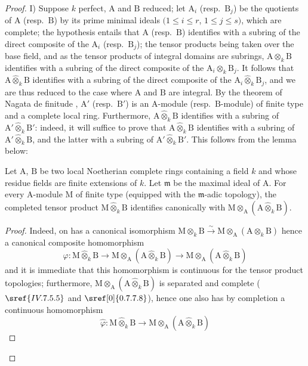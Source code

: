 \begin{proof}
I) Suppose $k$ perfect, $\mathrm{A}$ and $\mathrm{B}$ reduced; let $\mathrm{A}_i$ (resp.\ $\mathrm{B}_j$) be the quotients of $\mathrm{A}$ (resp.\ $\mathrm{B}$) by its prime minimal ideals $(1\leqslant i\leqslant r$, $1\leqslant j\leqslant s)$, which are complete; the hypothesis entails that $\mathrm{A}$ (resp.\ $\mathrm{B}$) identifies with a subring of the direct composite of the $\mathrm{A}_i$ (resp.\ $\mathrm{B}_j$); the tensor products being taken over the base field, and as the tensor products of integral domains are subrings, $\mathrm{A}\otimes_k\mathrm{B}$ identifies with a subring of the direct composite of the $\mathrm{A}_i\otimes_k\mathrm{B}_j$. It follows that $\mathrm{A}\widehat{\otimes}_k\mathrm{B}$ identifies with a subring of the direct composite of the $\mathrm{A}_i\widehat{\otimes}_k\mathrm{B}_j$, and we are thus reduced to the case where $\mathrm{A}$ and $\mathrm{B}$ are integral. By the theorem of Nagata de finitude , $\mathrm{A}'$ (resp.\ $\mathrm{B}'$) is an $\mathrm{A}$-module (resp.\ $\mathrm{B}$-module) of finite type and a complete local ring. Furthermore, $\mathrm{A}\widehat{\otimes}_k\mathrm{B}$ identifies with a subring of $\mathrm{A}'\widehat{\otimes}_k\mathrm{B}'$: indeed, it will suffice to prove that $\mathrm{A}\widehat{\otimes}_k\mathrm{B}$ identifies with a subring of $\mathrm{A}'\widehat{\otimes}_k\mathrm{B}$, and the latter with a subring of $\mathrm{A}'\widehat{\otimes}_k\mathrm{B}'$. This follows from the lemma below:

\begin{lemma}[7.5.7.1]
\label{IV.7.5.7.1}
Let $\mathrm{A}$, $\mathrm{B}$ be two local Noetherian complete rings containing a field $k$ and whose residue fields are finite extensions of $k$. Let $\mathfrak{m}$ be the maximal ideal of $\mathrm{A}$. For every $\mathrm{A}$-module $\mathrm{M}$ of finite type (equipped with the $\mathfrak{m}$-adic topology), the completed tensor product $\mathrm{M}\widehat{\otimes}_k\mathrm{B}$  identifies canonically with $\mathrm{M}\otimes_\mathrm{A}(\mathrm{A}\widehat{\otimes}_k\mathrm{B})$.
\end{lemma}

\begin{proof}
Indeed, on has a canonical isomorphism $\mathrm{M}\otimes_k\mathrm{B}\xrightarrow{\sim}\mathrm{M}\otimes_\mathrm{A}(\mathrm{A}\otimes_k\mathrm{B})$ hence a canonical composite homomorphism
\[
  \varphi:\mathrm{M}\widehat{\otimes}_k\mathrm{B}\to\mathrm{M}\otimes_\mathrm{A}(\mathrm{A}\widehat{\otimes}_k\mathrm{B})\to\mathrm{M}\otimes_\mathrm{A}(\mathrm{A}\widehat{\otimes}_k\mathrm{B})
\]
and it is immediate that this homomorphism is continuous for the tensor product topologies; furthermore, $\mathrm{M}\otimes_\mathrm{A}(\mathrm{A}\widehat{\otimes}_k\mathrm{B})$ is separated and complete ($\sref{IV.7.5.5}$ and $\sref[0]{0.7.7.8}$), hence one also has by completion a continuous homomorphism
\[
  \widehat{\varphi}:\mathrm{M}\widehat{\otimes}_k\mathrm{B}\to\mathrm{M}\otimes_\mathrm{A}(\mathrm{A}\widehat{\otimes}_k\mathrm{B})
\]


\end{proof}
\end{proof}
